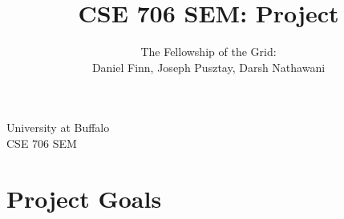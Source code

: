 \documentclass{article}
\begin{document}
\begin{titlepage}

\title{CSE 706 SEM: Project}
\author{The Fellowship of the Grid: \\
Daniel Finn, Joseph Pusztay, Darsh Nathawani}
\date{}
\maketitle
	\begin{center}
		University at Buffalo\\
		CSE 706 SEM\\
	\end{center}
\end{titlepage}

\section{Project Goals}
\end{document}
